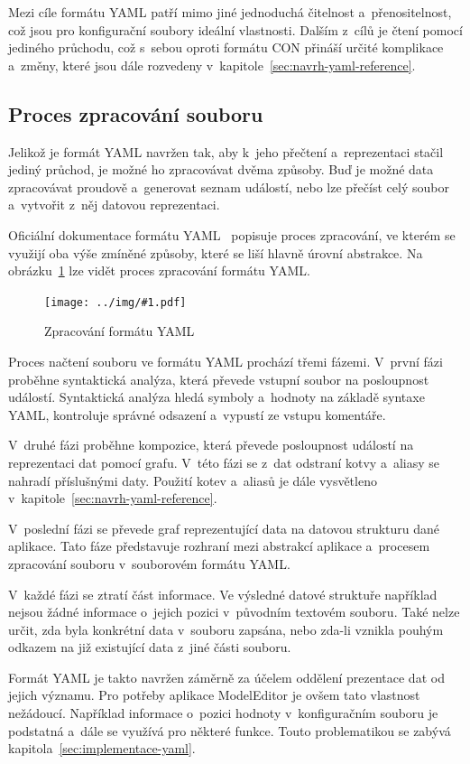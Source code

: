 \documentclass[FM,bw,DP]{tulthesis}
\newcommand{\includeimg}[2]{%
\begin{figure}[h]
	\centering
    \texttt{[image: ../img/\#1.pdf]}
    \caption{#2}
	\label{img:#1}
\end{figure}
}
\begin{document}
Mezi cíle formátu \gls{YAML} patří mimo jiné jednoduchá čitelnost a~přenositelnost, což jsou pro konfigurační soubory ideální vlastnosti. Dalším z~cílů je čtení pomocí jediného průchodu, což s~sebou oproti formátu \gls{CON} přináší určité komplikace a~změny, které jsou dále rozvedeny v~kapitole~\ref{sec:navrh-yaml-reference}.

\subsection{Proces zpracování souboru}

Jelikož je formát \gls{YAML} navržen tak, aby k~jeho přečtení a~reprezentaci stačil jediný průchod, je možné ho zpracovávat dvěma způsoby. Buď je možné data zpracovávat proudově a~generovat seznam událostí, nebo lze přečíst celý soubor a~vytvořit z~něj datovou reprezentaci.

Oficiální dokumentace formátu \gls{YAML}~\cite{bib:yaml} popisuje proces zpracování, ve kterém se využijí oba výše zmíněné způsoby, které se liší hlavně úrovní abstrakce. Na obrázku~\ref{img:yaml} lze vidět proces zpracování formátu \gls{YAML}.

\includeimg{yaml}{Zpracování formátu YAML}

Proces načtení souboru ve formátu \gls{YAML} prochází třemi fázemi. V~první fázi proběhne syntaktická analýza, která převede vstupní soubor na posloupnost událostí. Syntaktická analýza hledá symboly a~hodnoty na základě syntaxe \gls{YAML}, kontroluje správné odsazení a~vypustí ze vstupu komentáře.

V~druhé fázi proběhne kompozice, která převede posloupnost událostí na reprezentaci dat pomocí grafu. V~této fázi se z~dat odstraní kotvy a~aliasy se nahradí příslušnými daty. Použití kotev a~aliasů je dále vysvětleno v~kapitole~\ref{sec:navrh-yaml-reference}.

V~poslední fázi se převede graf reprezentující data na datovou strukturu dané aplikace. Tato fáze představuje rozhraní mezi abstrakcí aplikace a~procesem zpracování souboru v~souborovém formátu \gls{YAML}.

V~každé fázi se ztratí část informace. Ve výsledné datové struktuře například nejsou žádné informace o~jejich pozici v~původním textovém souboru. Také nelze určit, zda byla konkrétní data v~souboru zapsána, nebo zda-li vznikla pouhým odkazem na již existující data z~jiné části souboru.

Formát \gls{YAML} je takto navržen záměrně za účelem oddělení prezentace dat od jejich významu. Pro potřeby aplikace ModelEditor je ovšem tato vlastnost nežádoucí. Například informace o~pozici hodnoty v~konfiguračním souboru je podstatná a~dále se využívá pro některé funkce. Touto problematikou se zabývá kapitola~\ref{sec:implementace-yaml}.
\end{document}
